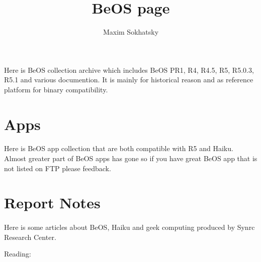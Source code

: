 \documentclass[11pt]{article}
\begin{document}

\title{BeOS page}
\author{Maxim Sokhatsky}


\section*{}
\paragraph{}
Here is BeOS collection archive which includes
BeOS PR1, R4, R4.5, R5, R5.0.3, R5.1 and various documention.
It is mainly for historical reason and as reference platform for binary compatibility.


\section*{Apps}
\paragraph{}
Here is BeOS app collection that are both compatible with R5 and Haiku.
Almost greater part of BeOS apps has gone so if you have great BeOS app that is
not listed on FTP please feedback.


\section*{Report Notes}
\paragraph{}
Here is some articles about BeOS, Haiku and geek computing produced by Synrc Research Center.

Reading: {}


\end{document}
